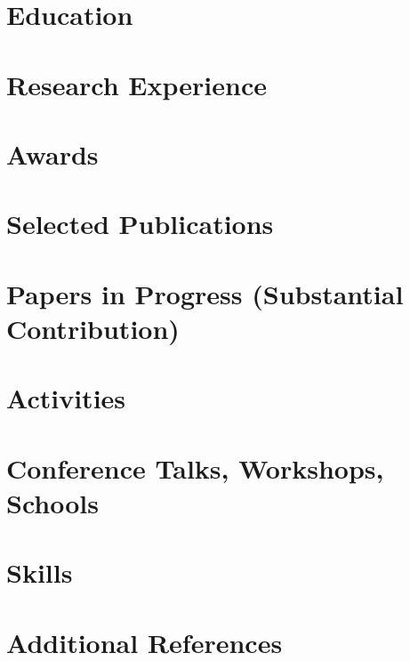 \documentclass[letter,10pt]{article}
\begin{document}


\section{Education}


\section{Research Experience}



\newpage

\section{Awards}


\section{Selected Publications}


\section{Papers in Progress (Substantial Contribution)}


\section{Activities}


\section{Conference Talks, Workshops, Schools}


\section{Skills}


\section{Additional References}

\end{document}
